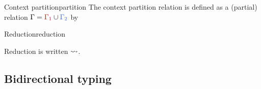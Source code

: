 \documentclass[10pt,a4paper]{notes-template}
\begin{document}
\begin{definition}{Context partition}{partition}
  The context partition relation is defined as a (partial) relation
  \(\Gamma = \part{\Gamma_{1}}{\Gamma_{2}}\) by
\end{definition}

\begin{definition}{Reduction}{reduction}

  Reduction is written \(\rightsquigarrow\). 
  
\end{definition}

\subsection{Bidirectional typing}
\end{document}
